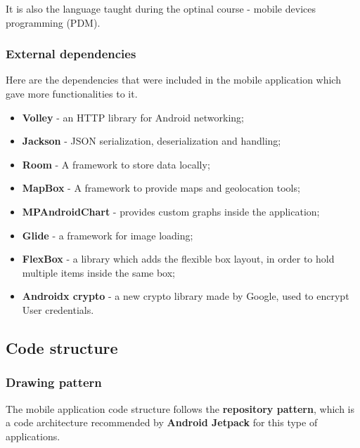 It is also the language taught during the optinal course - mobile devices programming (PDM).\\

\subsubsection{External dependencies}

Here are the dependencies that were included in the mobile application which gave more functionalities to it.

\begin{itemize}
    \item \textbf{Volley} - an HTTP library for Android networking;
    \item \textbf{Jackson} - JSON serialization, deserialization and handling;
    \item \textbf{Room} - A framework to store data locally;
    \item \textbf{MapBox} - A framework to provide maps and geolocation tools;
    \item \textbf{MPAndroidChart} - provides custom graphs inside the application;
    \item \textbf{Glide} - a framework for image loading;
    \item \textbf{FlexBox} - a library which adds the flexible box layout, in order to hold multiple items
    inside the same box;
    \item \textbf{Androidx crypto} - a new crypto library made by Google, used to encrypt User credentials.
\end{itemize}

\subsection{Code structure}

\subsubsection{Drawing pattern}

The mobile application code structure follows the \textbf{repository pattern}, which is a code architecture recommended by \textbf{Android Jetpack}\cite{jetpack} for this type of applications.\\

